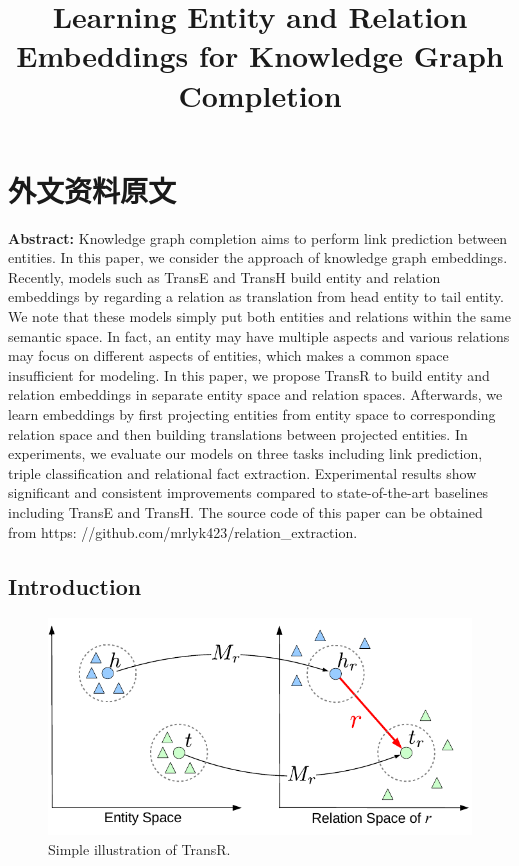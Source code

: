 \chapter{外文资料原文}
\label{cha:engorg}

\title{Learning Entity and Relation Embeddings for Knowledge Graph Completion}

\textbf{Abstract:}
Knowledge graph completion aims to perform link prediction between entities. In this paper, we consider the approach of knowledge graph embeddings. Recently, models such as TransE and TransH build entity and relation embeddings by regarding a relation as translation from head entity to tail entity. We note that these models simply put both entities and relations within the same semantic space. In fact, an entity may have multiple aspects and various relations may focus on different aspects of entities, which makes a common space insufficient for modeling. In this paper, we propose TransR to build entity and relation embeddings in separate entity space and relation spaces. Afterwards, we learn embeddings by first projecting entities from entity space to corresponding relation space and then building translations between projected entities. In experiments, we evaluate our models on three tasks including link prediction, triple classification and relational fact extraction. Experimental results show significant and consistent improvements compared to state-of-the-art baselines including TransE and TransH. The source code of this paper can be obtained from https: //github.com/mrlyk423/relation\_extraction.

\section{Introduction}

  \begin{figure}[htb]
  \centering
  \includegraphics[width=0.8\columnwidth]{figures/trans/model_idea}
  \caption{Simple illustration of TransR.}
  \label{fig:idea}
  \end{figure}

